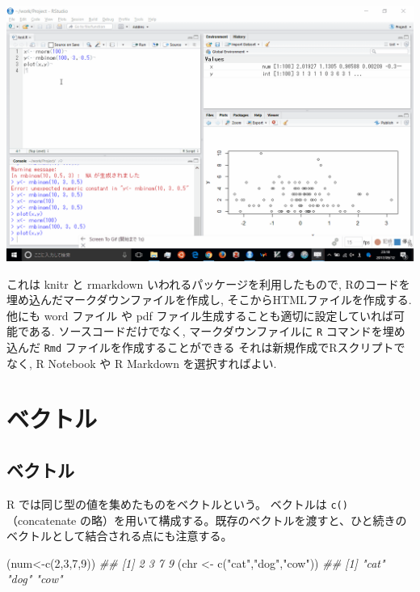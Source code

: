 \documentclass[
  letterpaper,
  xelatex,
  ja=standard, xelatex]{bxjsbook}
\newenvironment{Shaded}{\begin{snugshade}}{\end{snugshade}}
\newcommand{\DecValTok}[1]{\textcolor[rgb]{0.68,0.00,0.00}{#1}}
\newcommand{\DocumentationTok}[1]{\textcolor[rgb]{0.37,0.37,0.37}{\textit{#1}}}
\newcommand{\FunctionTok}[1]{\textcolor[rgb]{0.28,0.35,0.67}{#1}}
\newcommand{\NormalTok}[1]{\textcolor[rgb]{0.00,0.23,0.31}{#1}}
\newcommand{\OtherTok}[1]{\textcolor[rgb]{0.00,0.23,0.31}{#1}}
\newcommand{\StringTok}[1]{\textcolor[rgb]{0.13,0.47,0.30}{#1}}
\begin{document}
\includegraphics{figs/rstudio_knit.gif}

これは knitr と rmarkdown いわれるパッケージを利用したもので,
Rのコードを埋め込んだマークダウンファイルを作成し,
そこからHTMLファイルを作成する. 他にも word ファイル や pdf
ファイル生成することも適切に設定していれば可能である.
ソースコードだけでなく, マークダウンファイルに \texttt{R}
コマンドを埋め込んだ \texttt{Rmd} ファイルを作成することができる
それは新規作成でRスクリプトでなく, R Notebook や R Markdown
を選択すればよい.


\chapter{ベクトル}\label{ux30d9ux30afux30c8ux30eb}

\section{ベクトル}\label{ux30d9ux30afux30c8ux30eb-1}

R では同じ型の値を集めたものをベクトルという。 ベクトルは
\texttt{c()}（concatenate
の略）を用いて構成する。既存のベクトルを渡すと、ひと続きのベクトルとして結合される点にも注意する。

\begin{Shaded}
\begin{Highlighting}[]
\NormalTok{(num}\OtherTok{\textless{}{-}}\FunctionTok{c}\NormalTok{(}\DecValTok{2}\NormalTok{,}\DecValTok{3}\NormalTok{,}\DecValTok{7}\NormalTok{,}\DecValTok{9}\NormalTok{))}
\DocumentationTok{\#\# [1] 2 3 7 9}
\NormalTok{(chr }\OtherTok{\textless{}{-}} \FunctionTok{c}\NormalTok{(}\StringTok{"cat"}\NormalTok{,}\StringTok{"dog"}\NormalTok{,}\StringTok{"cow"}\NormalTok{))}
\DocumentationTok{\#\# [1] "cat" "dog" "cow"}
\end{Highlighting}
\end{Shaded}
\end{document}
